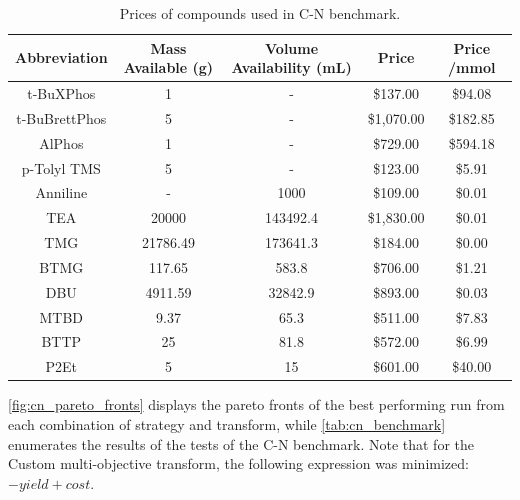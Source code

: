\begin{table}[]
\begin{tabular}{ccccc}
\textbf{Abbreviation} & \textbf{Mass Available (g)} & \textbf{Volume Availability (mL)} & \textbf{Price} & \textbf{Price /mmol} \\
\hline
t-BuXPhos     & 1        & -        & \$137.00   & \$94.08  \\
t-BuBrettPhos & 5        & -        & \$1,070.00 & \$182.85 \\
AlPhos        & 1        & -        & \$729.00   & \$594.18 \\
p-Tolyl TMS   & 5        & -        & \$123.00   & \$5.91   \\
Anniline      & -        & 1000     & \$109.00   & \$0.01   \\
TEA           & 20000    & 143492.4 & \$1,830.00 & \$0.01   \\
TMG           & 21786.49 & 173641.3 & \$184.00   & \$0.00   \\
BTMG          & 117.65   & 583.8    & \$706.00   & \$1.21   \\
DBU           & 4911.59  & 32842.9  & \$893.00   & \$0.03   \\
MTBD          & 9.37     & 65.3     & \$511.00   & \$7.83   \\
BTTP          & 25       & 81.8     & \$572.00   & \$6.99   \\
P2Et          & 5        & 15       & \$601.00   & \$40.00 
\end{tabular}
\caption{Prices of compounds used in C-N benchmark.}
\label{tab:cn_benchmark_prices_2}
\end{table}

\ref{fig:cn_pareto_fronts} displays the pareto fronts of the best performing run from each combination of strategy and transform, while \ref{tab:cn_benchmark} enumerates the results of the tests of the C-N benchmark. Note that for the Custom multi-objective transform, the following expression was minimized: $-yield+cost$.

